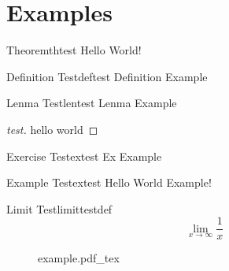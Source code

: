\section{Examples}
\begin{theorem}{Theorem}{thtest}
    Hello World!
\end{theorem}

\begin{definition}{Definition Test}{deftest}
    Definition Example
\end{definition}

\begin{lenma}{Lenma Test}{lentest}
    Lenma Example
\end{lenma}
\begin{proof}[test]
    hello world
\end{proof}
\begin{exercise}{Exercise Test}{extest}
    Ex Example
\end{exercise}
\begin{example}{Example Test}{extest}
    Hello World Example!
\end{example}

\begin{definition}{Limit Test}{limittestdef}
    \begin{equation*}
        \lim_{x\rightarrow\infty}{\frac1x}
    \end{equation*}
\end{definition}

\begin{figure}[H]
    \def\svgwidth{\columnwidth}
    {example.pdf_tex}
\end{figure}